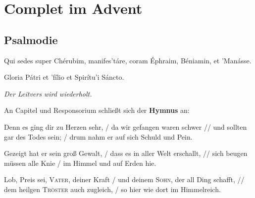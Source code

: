 \chapter{Complet im Advent}
\def\gebet{\textsc{Complet im Advent}}
 \section*{Psalmodie}
\begin{multicols}{2}\setlength{\columnseprule}{0.2pt}
Qui sedes super Chérubim, manifes'táre, \grestar{} coram Éphraim, Béniamin, et 'Manásse.\par
{}\par\vfill\columnbreak
Gloria Pátri et 'fílio \grestar{} et Spirítu'i Sáncto.\par
{}\par
\end{multicols}\enlargethispage{5em}
\textit{Der Leitvers wird wiederholt.}\par
An Capitel und Responsorium schließt sich der \textbf{Hymnus} an:\par
{}
\begin{multicols}{2}\setlength{\columnseprule}{0.2pt}
Denn es ging dir zu Herzen sehr, / da wir gefangen waren schwer // und sollten gar des Todes sein; / drum nahm er auf sich Schuld und Pein.\par
{}\par
Gezeigt hat er sein groß Gewalt, / dass es in aller Welt erschallt, // sich beugen müssen alle Knie / im Himmel und auf Erden hie.\par
{}\par
\Abar Lob, Preis sei, \textsc{Vater}, deiner Kraft / und deinem \textsc{Sohn}, der all Ding schafft, // dem heilgen \textsc{Tröster} auch zugleich, / so hier wie dort im Himmelreich.\par
\end{multicols}
\begin{center}
{\centering{\scalebox{3}{\grecross}}}
\end{center}